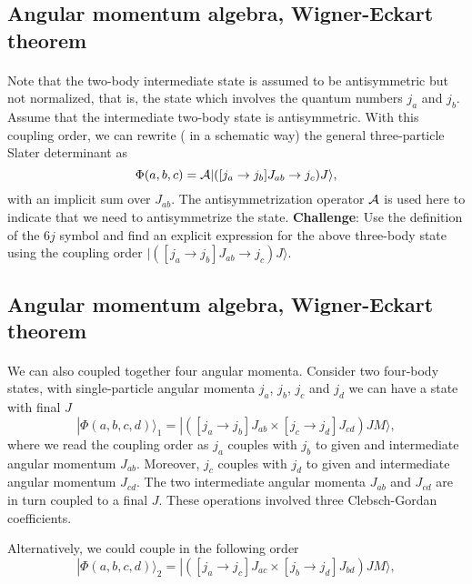 \documentclass[%
twoside,                 %
final,                   %
10pt]{article}
\begin{document}
\subsection*{Angular momentum algebra, Wigner-Eckart theorem}

\paragraph{}
Note that the two-body intermediate state is assumed to be antisymmetric but
not normalized, that is, the state which involves the quantum numbers 
$j_a$ and $j_b$. Assume that the intermediate 
two-body state is antisymmetric. With this coupling order, we can 
rewrite ( in a schematic way) the general three-particle Slater determinant as 
\[
\Phi(a,b,c) = {\cal A} | ([j_a\rightarrow j_b]J_{ab}\rightarrow j_c) J\rangle, 
\]
with an implicit sum over $J_{ab}$.  The antisymmetrization operator ${\cal A}$ is used here to indicate that we need to antisymmetrize the state. \textbf{Challenge}: Use the definition of the $6j$ symbol and find an explicit 
expression for the above three-body state using the coupling order $| ([j_a\rightarrow j_b]J_{ab}\rightarrow j_c) J\rangle$.



\subsection*{Angular momentum algebra, Wigner-Eckart theorem}

\paragraph{}
We can also coupled together four angular momenta. Consider two four-body states, with single-particle angular momenta $j_a$, $j_b$, $j_c$ and $j_d$ we can have a state with final $J$
\[
|\Phi(a,b,c,d)\rangle_1 = | ([j_a\rightarrow j_b]J_{ab}\times [j_c\rightarrow j_d]J_{cd}) JM\rangle, 
\]
where we read the coupling order as $j_a$ couples with $j_b$ to given and intermediate angular momentum $J_{ab}$. 
Moreover, $j_c$ couples with $j_d$ to given and intermediate angular momentum $J_{cd}$.  The two intermediate angular momenta $J_{ab}$ and $J_{cd}$
are in turn coupled to a final $J$.  These operations involved three Clebsch-Gordan coefficients. 

Alternatively, we could couple in the following order
\[
|\Phi(a,b,c,d)\rangle_2 = | ([j_a\rightarrow j_c]J_{ac}\times [j_b\rightarrow j_d]J_{bd}) JM\rangle, 
\]
\end{document}
